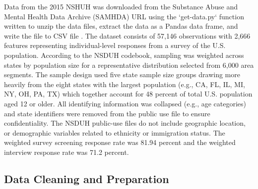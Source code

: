 \documentclass[sigconf]{acmart}
\begin{document}
Data from the 2015 NSHUH was downloaded from the Substance Abuse and Mental 
Health Data Archive (SAMHDA) \cite{samhsa16} URL using the `get-data.py` 
function written to unzip the data files, extract the data as a Pandas data 
frame, and write the file to CSV file \cite{getdata17}. The dataset consists 
of 57,146 observations with 2,666 features representing individual-level 
responses from a survey of the U.S. population. According to the NSDUH 
codebook, sampling was weighted across states by population size for a 
representative distribution selected from 6,000 area segments. The sample 
design used five state sample size groups drawing more heavily from the eight 
states with the largest population (e.g., CA, FL, IL, MI, NY, OH, PA, TX) which 
together account for 48 percent of total U.S. population aged 12 or older. 
All identifying information was collapsed (e.g., age categories) and state 
identifiers were removed from the public use file to ensure confidentiality. 
The NSDUH public-use files do not include geographic location, or demographic 
variables related to ethnicity or immigration status. The weighted survey 
screening response rate was 81.94 percent and the weighted interview response 
rate was 71.2 percent. 

\subsection{Data Cleaning and Preparation }
\end{document}
